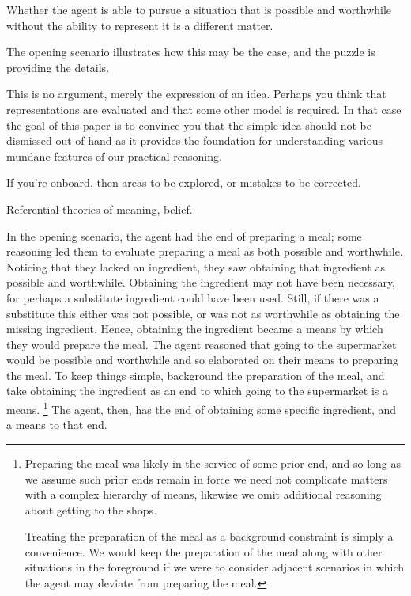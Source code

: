 \documentclass[10pt]{article}
\begin{document}
Whether the agent is able to pursue a situation that is possible and worthwhile without the ability to represent it is a different matter.




The opening scenario illustrates how this may be the case, and the puzzle is providing the details.





This is no argument, merely the expression of an idea.
Perhaps you think that representations are evaluated and that some other model is required.
In that case the goal of this paper is to convince you that the simple idea should not be dismissed out of hand as it provides the foundation for understanding various mundane features of our practical reasoning.

If you're onboard, then areas to be explored, or mistakes to be corrected.




Referential theories of meaning, belief.








In the opening scenario, the agent had the end of preparing a meal; some reasoning led them to evaluate preparing a meal as both possible and worthwhile.
Noticing that they lacked an ingredient, they saw obtaining that ingredient as possible and worthwhile.
Obtaining the ingredient may not have been necessary, for perhaps a substitute ingredient could have been used.
Still, if there was a substitute this either was not possible, or was not as worthwhile as obtaining the missing ingredient.
Hence, obtaining the ingredient became a means by which they would prepare the meal.
The agent reasoned that going to the supermarket would be possible and worthwhile and so elaborated on their means to preparing the meal.
To keep things simple, background the preparation of the meal, and take obtaining the ingredient as an end to which going to the supermarket is a means.\nolinebreak
\footnote{
  Preparing the meal was likely in the service of some prior end, and so long as we assume such prior ends remain in force we need not complicate matters with a complex hierarchy of means, likewise we omit additional reasoning about getting to the shops.

  Treating the preparation of the meal as a background constraint is simply a convenience.
We would keep the preparation of the meal along with other situations in the foreground if we were to consider adjacent scenarios in which the agent may deviate from preparing the meal.}
The agent, then, has the end of obtaining some specific ingredient, and a means to that end.
\end{document}
